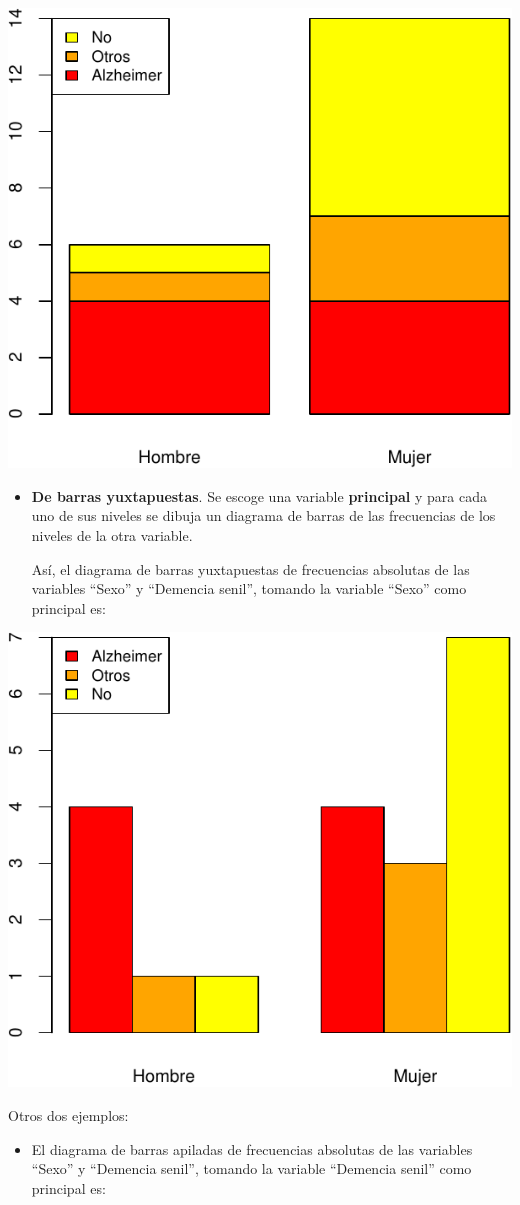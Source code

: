 \documentclass[
]{book}
\providecommand{\tightlist}{%
  \setlength{\itemsep}{0pt}\setlength{\parskip}{0pt}}
\theoremstyle{definition}
\theoremstyle{definition}
\theoremstyle{definition}
\theoremstyle{definition}
\theoremstyle{remark}
\begin{document}
\begin{center}\includegraphics[width=0.5\linewidth]{INREMDN_files/figure-latex/unnamed-chunk-229-1} \end{center}

\begin{itemize}
\item
  \textbf{De barras yuxtapuestas}. Se escoge una variable \textbf{principal} y para cada uno de sus niveles se dibuja un diagrama de barras de las frecuencias de los niveles de la otra variable.

  Así, el diagrama de barras yuxtapuestas de frecuencias absolutas de las variables ``Sexo'' y ``Demencia senil'', tomando la variable ``Sexo'' como principal es:
\end{itemize}

\begin{center}\includegraphics[width=0.5\linewidth]{INREMDN_files/figure-latex/unnamed-chunk-230-1} \end{center}

Otros dos ejemplos:

\begin{itemize}
\tightlist
\item
  El diagrama de barras apiladas de frecuencias absolutas de las variables ``Sexo'' y ``Demencia senil'', tomando la variable ``Demencia senil'' como principal es:
\end{itemize}
\end{document}
